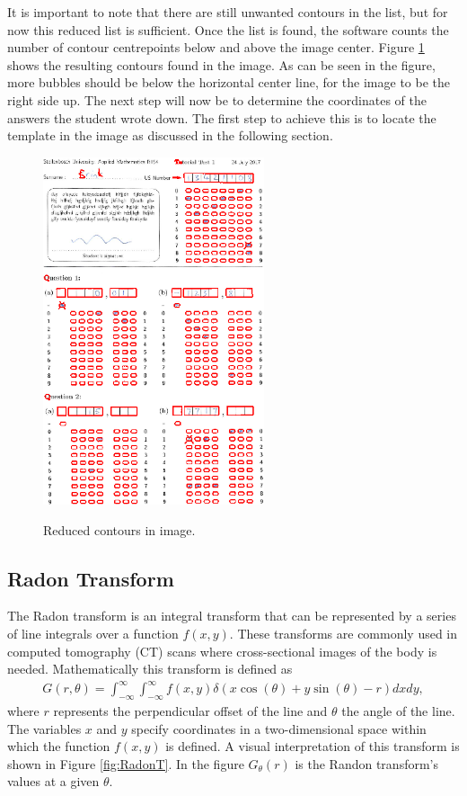 It is important to note that there are still unwanted contours in the list, but for now this reduced list is sufficient. Once the list is found, the software counts the number of contour centrepoints below and above the image center. Figure \ref{fig:reduced} shows the resulting contours found in the image. As can be seen in the figure, more bubbles should be below the horizontal center line, for the image to be the right side up. The next step will now be to determine the coordinates of the answers the student wrote down. The first step to achieve this is to locate the template in the image as discussed in the following section.

\begin{figure}
  \centering
  \includegraphics[width=6.5cm]{Reduced}\\
  \caption{Reduced contours in image.}
  \label{fig:reduced}
\end{figure}

\subsection{Radon Transform}
\label{sec:RadonTransform}
The Radon transform is an integral transform that can be represented by a series of line integrals over a function $f(x,y)$. These transforms are commonly used in computed tomography (CT) scans where cross-sectional images of the body is needed. Mathematically this transform is defined as 
\begin{align}
G(r,\theta) = \int_{-\infty}^{\infty} \int_{-\infty}^{\infty} f(x, y) \delta(x\cos(\theta) + y\sin(\theta) - r) dx dy,
\label{eqn:radon}
\end{align}where $r$ represents the perpendicular offset of the line and $\theta$ the angle of the line. The variables $x$ and $y$ specify coordinates in a two-dimensional space within which the function $f(x,y)$ is defined.  A visual interpretation of this transform is shown in Figure \ref{fig:RadonT}. In the figure $G_\theta(r)$ is the Randon transform's values at a given $\theta$.

